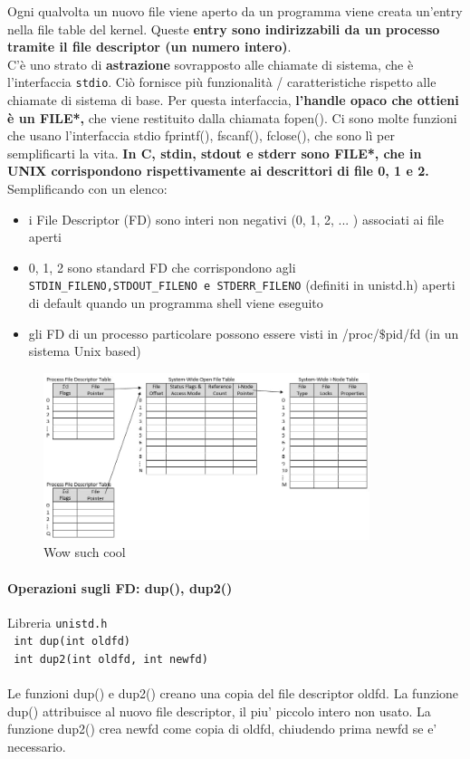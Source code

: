 Ogni qualvolta un nuovo file viene aperto da un programma viene creata un'entry nella file table del kernel. Queste \textbf{entry sono indirizzabili da un processo tramite il file descriptor (un numero intero)}.
\\
C'è uno strato di \textbf{astrazione} sovrapposto alle chiamate di sistema, che è l'interfaccia \texttt{stdio}. Ciò fornisce più funzionalità / caratteristiche rispetto alle chiamate di sistema di base. Per questa interfaccia, \textbf{l'handle opaco che ottieni è un FILE*,} che viene restituito dalla chiamata fopen(). Ci sono molte funzioni che usano l'interfaccia stdio fprintf(), fscanf(), fclose(), che sono lì per semplificarti la vita. \textbf{In C, stdin, stdout e stderr sono FILE*, che in UNIX corrispondono rispettivamente ai descrittori di file 0, 1 e 2.}
Semplificando con un elenco:
\begin{itemize}
    \item i File Descriptor (FD) sono interi non negativi (0, 1, 2, ... ) associati ai file aperti
    \item 0, 1, 2 sono standard FD che corrispondono agli \texttt{STDIN\_FILENO,STDOUT\_FILENO e STDERR\_FILENO} (definiti in unistd.h) aperti di default quando un programma shell viene eseguito
    \item gli FD di un processo particolare possono essere visti in /proc/$\$$pid/fd (in un sistema Unix based)
\end{itemize}

\begin{figure}[h]
    \centering
    \includegraphics[width=0.85\textwidth]{fds.jpg}
    \caption{Wow such cool}
\end{figure}


\paragraph{Operazioni sugli FD: dup(), dup2()}
Libreria \texttt{unistd.h}\\
    \texttt{    int dup(int oldfd)}\\
    \texttt{    int dup2(int oldfd, int newfd)}\\ \\
Le funzioni dup() e dup2() creano una copia del file descriptor oldfd.
La funzione dup() attribuisce al nuovo file descriptor, il piu' piccolo intero non usato.
La funzione dup2() crea newfd come copia di oldfd, chiudendo prima newfd se e' necessario.

